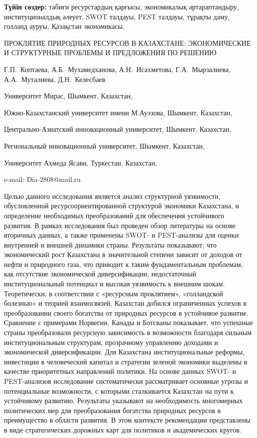 {\bfseries Түйін сөздер:} табиғи ресурстардың қарғысы, экономикалық
әртараптандыру, институционалдық әлеует, SWOT талдауы, PEST талдауы,
тұрақты даму, голланд ауруы, Қазақстан экономикасы.

\begin{header}
ПРОКЛЯТИЕ ПРИРОДНЫХ РЕСУРСОВ В КАЗАХСТАНЕ: ЭКОНОМИЧЕСКИЕ И СТРУКТУРНЫЕ ПРОБЛЕМЫ И ПРЕДЛОЖЕНИЯ ПО РЕШЕНИЮ

Г.П.~Коптаева,
А.Б.~Мухамедханова,
А.Н.~Исахметова,
Г.А.~Мырзалиева,
А.А.~Муталиева,
Д.Н.~Келесбаев\envelope
\end{header}

\begin{affil}
Университет Мирас, Шымкент, Казахстан,

Южно-Казахстанский университет имени М.Ауэзова, Шымкент, Казахстан,

Центрально-Азиатский инновационный университет, Шымкент, Казахстан,

Региональный инновационный университет, Шымкент, Казахстан,

Университет Ахмеда Ясави, Туркестан, Казахстан,

e-mail: Dia-2808@mail.ru
\end{affil}

Целью данного исследования является анализ структурной уязвимости,
обусловленной ресурсоориентированной структурой экономики Казахстана, и
определение необходимых преобразований для обеспечения устойчивого
развития. В рамках исследования был проведен обзор литературы на основе
вторичных данных, а также применены SWOT- и PEST-анализы для оценки
внутренней и внешней динамики страны. Результаты показывают, что
экономический рост Казахстана в значительной степени зависит от доходов
от нефти и природного газа, что приводит к таким фундаментальным
проблемам, как отсутствие экономической диверсификации, недостаточный
институциональный потенциал и высокая уязвимость к внешним шокам.
Теоретически, в соответствии с «ресурсным проклятием», «голландской
болезнью» и теорией взаимосвязей, Казахстан добился ограниченных успехов
в преобразовании своего богатства от природных ресурсов в устойчивое
развитие. Сравнение с примерами Норвегии, Канады и Ботсваны показывает,
что успешные страны преобразовали ресурсную зависимость в возможности
благодаря сильным институциональным структурам, прозрачному управлению
доходами и экономической диверсификации. Для Казахстана
институциональные реформы, инвестиции в человеческий капитал и стратегии
зеленой экономики выделены в качестве приоритетных направлений политики.
На основе данных SWOT- и PEST-анализов исследование систематически
рассматривает основные угрозы и потенциальные возможности, с которыми
сталкивается Казахстан на пути к устойчивому развитию. Результаты
указывают на необходимость многомерных политических мер для
преобразования богатства природных ресурсов в преимущество в области
развития. В этом контексте рекомендации представлены в виде
стратегических дорожных карт для политиков и академических кругов.

